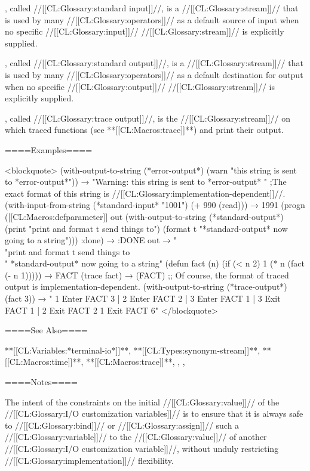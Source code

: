 , called //[[CL:Glossary:standard input]]//, is a //[[CL:Glossary:stream]]// that is used by many //[[CL:Glossary:operators]]// as a default source of input when no specific //[[CL:Glossary:input]]// //[[CL:Glossary:stream]]// is explicitly supplied.


, called //[[CL:Glossary:standard output]]//, is a //[[CL:Glossary:stream]]// that is used by many //[[CL:Glossary:operators]]// as a default destination for output when no specific //[[CL:Glossary:output]]// //[[CL:Glossary:stream]]// is explicitly supplied.

, called //[[CL:Glossary:trace output]]//, is the //[[CL:Glossary:stream]]// on which traced functions (see **[[CL:Macros:trace]]**) and  print their output.

====Examples====

<blockquote> (with-output-to-string (*error-output*) (warn "this string is sent to *error-output*")) → "Warning: this string is sent to *error-output* " ;The exact format of this string is //[[CL:Glossary:implementation-dependent]]//. \medbreak (with-input-from-string (*standard-input* "1001") (+ 990 (read))) → 1991 \medbreak (progn ([[CL:Macros:defparameter]] out (with-output-to-string (*standard-output*) (print "print and format t send things to") (format t "*standard-output* now going to a string"))) :done) → :DONE out → " \\"print and format t send things to\\" *standard-output* now going to a string" \medbreak (defun fact (n) (if (< n 2) 1 (* n (fact (- n 1))))) → FACT (trace fact) → (FACT) ;; Of course, the format of traced output is implementation-dependent. (with-output-to-string (*trace-output*) (fact 3)) → " 1 Enter FACT 3 | 2 Enter FACT 2 | 3 Enter FACT 1 | 3 Exit FACT 1 | 2 Exit FACT 2 1 Exit FACT 6" </blockquote>

====See Also====

**[[CL:Variables:*terminal-io*]]**, **[[CL:Types:synonym-stream]]**, **[[CL:Macros:time]]**, **[[CL:Macros:trace]]**, {\chapref\Conditions}, {\chapref\Reader}, {\chapref\Printer}

====Notes====

The intent of the constraints on the initial //[[CL:Glossary:value]]// of the //[[CL:Glossary:I/O customization variables]]// is to ensure that it is always safe to //[[CL:Glossary:bind]]// or //[[CL:Glossary:assign]]// such a //[[CL:Glossary:variable]]// to the //[[CL:Glossary:value]]// of another //[[CL:Glossary:I/O customization variable]]//, without unduly restricting //[[CL:Glossary:implementation]]// flexibility.

